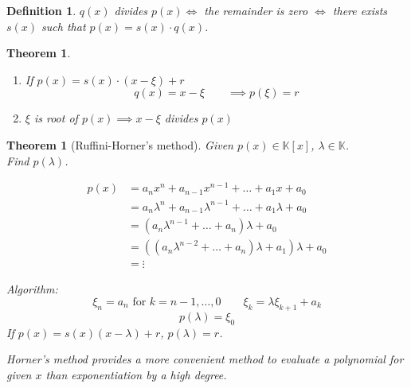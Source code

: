 \documentclass{article}
\newcounter{lecref}[section]
\numberwithin{lecref}{section}
\newtheorem{theorem}[lecref]{Theorem}
\newtheorem{definition}[lecref]{Definition}
\begin{document}
\begin{definition} %
  $q(x)$ \emph{divides} $p(x) \iff $ the remainder is zero
  $\iff$ there exists $s(x)$ such that $p(x) = s(x) \cdot q(x)$.
\end{definition}

\begin{theorem} %
  \begin{enumerate}
    \item If $p(x) = s(x) \cdot (x - \xi) + r$
      \[ q(x) = x - \xi \qquad \implies p(\xi) = r \]
    \item $\xi$ is root of $p(x) \implies x - \xi$ divides $p(x)$
  \end{enumerate}
\end{theorem}

\begin{theorem}[Ruffini-Horner's method]
  Given $p(x) \in \mathbb K[x]$, $\lambda \in \mathbb K$. \\
  Find $p(\lambda)$.

  \begin{align*}
    p(x) &= a_n x^n + a_{n-1} x^{n-1} + \dots + a_1 x + a_0 \\
      &= a_n \lambda^n + a_{n-1} \lambda^{n-1} + \ldots + a_1 \lambda + a_0 \\
      &= \left(a_n \lambda^{n-1} + \dots + a_n\right) \lambda + a_0 \\
      &= \left((a_n \lambda^{n-2} + \dots + a_n) \lambda + a_1\right) \lambda + a_0 \\
      &= \vdots
  \end{align*}

  Algorithm:
  \[ \xi_n = a_n \text{ for } k = n-1, \dots, 0 \qquad \xi_k = \lambda \xi_{k+1} + a_k \]
  \[ p(\lambda) = \xi_0 \]
  If $p(x) = s(x) (x - \lambda) + r$, $p(\lambda) = r$.

  Horner's method provides a more convenient method to evaluate a polynomial for given $x$
  than exponentiation by a high degree.
\end{theorem}
\end{document}
